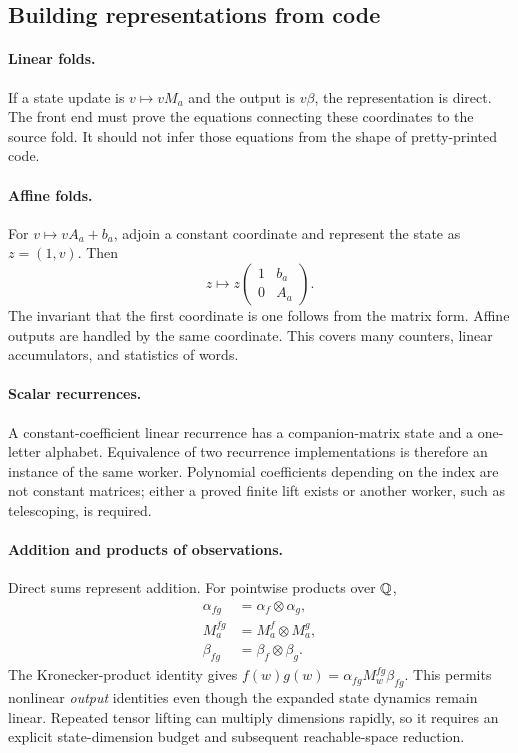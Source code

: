 \subsection{Building representations from code}

\paragraph{Linear folds.}
If a state update is $v\mapsto vM_a$ and the output is $v\beta$, the
representation is direct. The front end must prove the equations connecting
these coordinates to the source fold. It should not infer those equations from
the shape of pretty-printed code.

\paragraph{Affine folds.}
For $v\mapsto vA_a+b_a$, adjoin a constant coordinate and represent the state as
$z=(1,v)$. Then
\[
 z\longmapsto z\begin{pmatrix}1&b_a\\0&A_a\end{pmatrix}.
\]
The invariant that the first coordinate is one follows from the matrix form.
Affine outputs are handled by the same coordinate. This covers many counters,
linear accumulators, and statistics of words.

\paragraph{Scalar recurrences.}
A constant-coefficient linear recurrence has a companion-matrix state and a
one-letter alphabet. Equivalence of two recurrence implementations is therefore
an instance of the same worker. Polynomial coefficients depending on the index
are not constant matrices; either a proved finite lift exists or another
worker, such as telescoping, is required.

\paragraph{Addition and products of observations.}
Direct sums represent addition. For pointwise products over $\mathbb{Q}$,
\begin{align*}
 \alpha_{fg}&=\alpha_f\otimes\alpha_g,\\
 M^{fg}_a&=M^f_a\otimes M^g_a,\\
 \beta_{fg}&=\beta_f\otimes\beta_g.
\end{align*}
The Kronecker-product identity gives
$f(w)g(w)=\alpha_{fg}M^{fg}_w\beta_{fg}$. This permits nonlinear \emph{output}
identities even though the expanded state dynamics remain linear. Repeated
tensor lifting can multiply dimensions rapidly, so it requires an explicit
state-dimension budget and subsequent reachable-space reduction.

